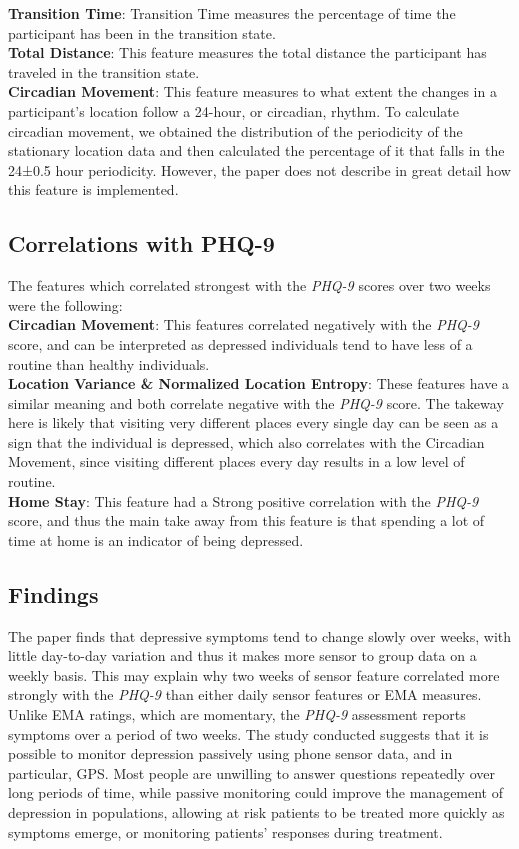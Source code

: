 \textbf{Transition Time}: Transition Time measures the percentage of time the participant has been in the transition state.\\

\textbf{Total Distance}: This feature measures the total distance the participant has traveled in the transition state.\\

\textbf{Circadian Movement}: This feature measures to what extent the changes in a
participant’s location follow a 24-hour, or circadian, rhythm. To calculate circadian movement, we obtained the distribution of the periodicity of the stationary location data and then calculated the percentage of it that falls in the 24±0.5 hour periodicity. However, the paper does not describe in great detail how this feature is implemented.\\

\subsection{Correlations with PHQ-9}
The features which correlated strongest with the \textit{PHQ-9} scores over two weeks were the following:\\

\textbf{Circadian Movement}: This features correlated negatively with the \textit{PHQ-9} score, and can be interpreted as depressed individuals tend to have less of a routine than healthy individuals. \\

\textbf{Location Variance \& Normalized Location Entropy}: These features have a similar meaning and both correlate negative with the \textit{PHQ-9} score. The takeway here is likely that visiting very different places every single day can be seen as a sign that the individual is depressed, which also correlates with the Circadian Movement, since visiting different places every day results in a low level of routine.\\

\textbf{Home Stay}: This feature had a Strong positive correlation with the \textit{PHQ-9} score, and thus the main take away from this feature is that spending a lot of time at home is an indicator of being depressed.

\subsection{Findings}
The paper finds that depressive symptoms tend to change slowly over weeks, with little day-to-day variation and thus it makes more sensor to group data on a weekly basis. This may explain why two weeks of sensor feature correlated more strongly with the \textit{PHQ-9} than either daily sensor features or EMA measures. Unlike EMA ratings, which are momentary, the \textit{PHQ-9} assessment reports symptoms over a period of two weeks. The study conducted suggests that it is possible to monitor depression passively using phone sensor data, and in particular, GPS. Most people are unwilling to answer questions repeatedly over long periods of time, while passive monitoring could improve the management of depression in populations, allowing at risk patients to be treated more quickly as symptoms emerge, or monitoring patients’ responses during treatment.